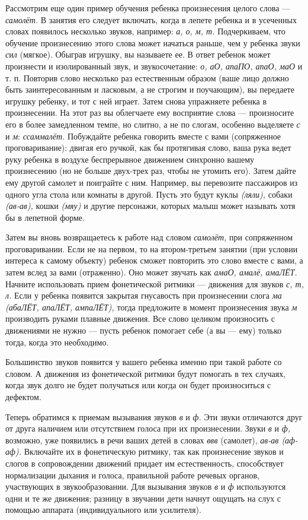 \documentclass[a5paper]{book}
\renewcommand{\emph}[1]{\textit{#1}}
\begin{document}
Рассмотрим еще один пример обучения ребенка произнесения целого слова
--- \emph{самолёт.} В занятия его следует включать, когда в лепете
ребенка и в усеченных словах появилось несколько звуков, например:
\emph{а, о, м, т.} Подчеркиваем, что обучение произнесению этого слова
может начаться раньше, чем у ребенка звуки \emph{с}и\emph{л} (мягкое).
Обыграв игрушку, вы называете ее. В ответ ребенок может произнести и
изолированный звук, и звукосочетание: \emph{о, аО, апаПО, апаО, маО} и
т. п. Повторив слово несколько раз естественным образом (ваше лицо
должно быть заинтересованным и ласковым, а не строгим и поучающим), вы
передаете игрушку ребенку, и тот с ней играет. Затем снова упражняете
ребенка в произнесении. На этот раз вы облегчаете ему восприятие слова
--- произносите его в более замедленном темпе, но слитно, а не по
слогам, особенно выделяете \emph{с} и \emph{м}: \emph{ссаммалёт.}
Побуждайте ребенка говорить вместе с вами (сопряженное проговаривание):
двигая его ручкой, как бы протягивая слово, ваша рука ведет руку ребенка
в воздухе беспрерывное движением синхронно вашему произнесению (но не
больше двух-трех раз, чтобы не утомить его). Затем дайте ему другой
самолет и поиграйте с ним. Например, вы перевозите пассажиров из одного
угла стола или комнаты в другой. Пусть это будут куклы \emph{(ляли),}
собаки \emph{(ав-ав),} кошки \emph{(мяу)} и другие персонажи, которых
малыш может называть хотя бы в лепетной форме.

Затем вы вновь возвращаетесь к работе над словом \emph{самолёт,} при
сопряженном проговаривании. Если не на первом, то на втором-третьем
занятии (при условии интереса к самому объекту) ребенок сможет повторить
это слово вместе с вами, а затем вслед за вами (отраженно). Оно может
звучать как \emph{амаО, амалё, амаЛЁТ.} Начните использовать прием
фонетической ритмики --- движения для звуков \emph{с, т, л.} Если у
ребенка появится закрытая гнусавость при произнесении слога \emph{ма
(абаЛЁТ, апаЛЁТ, ампаЛЁТ),} тогда предложите в момент произнесения звука
\emph{м} производить руками плавные движения. Все слово целиком
произносить с движениями не нужно --- пусть ребенок помогает себе (а вы
--- ему) только тогда, когда это необходимо.

Большинство звуков появится у вашего ребенка именно при такой работе со
словом. А движения из фонетической ритмики будут помогать в тех случаях,
когда звук долго не будет получаться или когда он будет произноситься с
дефектом.

Теперь обратимся к приемам вызывания звуков \emph{в} и \emph{ф.} Эти
звуки отличаются друг от друга наличием или отсутствием голоса при их
произнесении. Звуки \emph{в} и \emph{ф,} возможно, уже появились в речи
ваших детей в словах \emph{ввв} (самолет), \emph{ав-ав (аф-аф).}
Включайте их в фонетическую ритмику, так как произнесение звуков и
слогов в сопровождении движений придает им естественность, способствует
нормализации дыхания и голоса, правильной работе речевых органов,
участвующих в звукообразовании. Для вызывания звуков \emph{в} и \emph{ф}
используются одни и те же движения; разницу в звучании дети начнут
ощущать на слух с помощью аппарата (индивидуального или усилителя).
\end{document}
